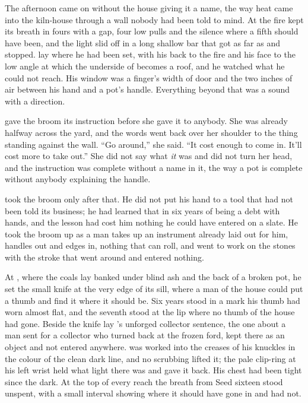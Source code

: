 The afternoon came on without the house giving it a name, the way heat came into the kiln-house through a wall nobody had been told to mind. At  the fire kept its breath in fours with a gap, four low pulls and the silence where a fifth should have been, and the light slid off  in a long shallow bar that got as far as  and stopped.  lay where he had been set, with his back to the fire and his face to the low angle at which the underside of  becomes a roof, and he watched what he could not reach. His window was a finger's width of door and the two inches of air between his hand and a pot's handle. Everything beyond that was a sound with a direction.

 gave the broom its instruction before she gave it to anybody. She was already halfway across the yard, and the words went back over her shoulder to the thing standing against the wall. “Go around,” she said. “It cost enough to come in. It'll cost more to take out.” She did not say what \emph{it} was and did not turn her head, and the instruction was complete without a name in it, the way a pot is complete without anybody explaining the handle.

 took the broom only after that. He did not put his hand to a tool that had not been told its business; he had learned that in six years of being a debt with hands, and the lesson had cost him nothing he could have entered on a slate. He took the broom up as a man takes up an instrument already laid out for him, handles out and edges in, nothing that can roll, and went to work on the stones with the stroke that went around and entered nothing.

At , where the coals lay banked under blind ash and the back of a broken pot, he set the small knife at the very edge of its sill, where a man of the house could put a thumb and find it where it should be. Six years stood in a mark his thumb had worn almost flat, and the seventh stood at the lip where no thumb of the house had gone. Beside the knife lay 's unforged collector sentence, the one about a man sent for a collector who turned back at the frozen ford, kept there as an object and not entered anywhere.  was worked into the creases of his knuckles in the colour of the clean dark line, and no scrubbing lifted it; the pale clip-ring at his left wrist held what light there was and gave it back. His chest had been tight since the dark. At the top of every reach the breath from Seed sixteen stood unspent, with a small interval showing where it should have gone in and had not.

